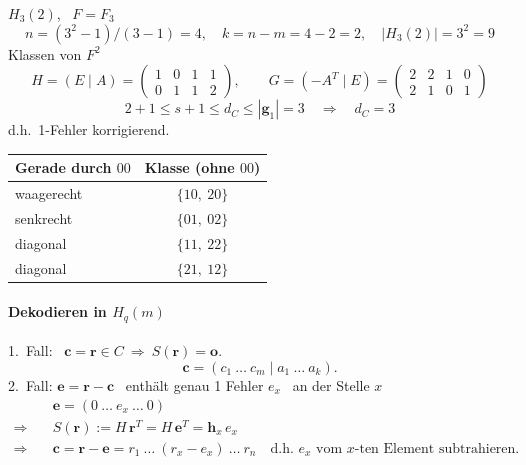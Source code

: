 \begin{beispiel}
$H_3(2)$, \ $F = F_3$
\[ n = (3^2 - 1)/(3 - 1) = 4, \quad k = n - m = 4 - 2 = 2, \quad |H_3(2)| = 3^2 = 9 \]
Klassen von $F^2$
\[
H = (E \mid A) = \begin{pmatrix} 1 & 0 & 1 & 1 \\ 0 & 1 & 1 & 2 \end{pmatrix}, \qquad
G = (-A^T \mid E) = \begin{pmatrix} 2 & 2 & 1 & 0 \\ 2 & 1 & 0 & 1 \end{pmatrix}
\]
\[ 2 + 1 \leq s + 1 \leq d_C \leq |\mathbf{g}_1| = 3 \quad \Rightarrow \quad d_C = 3 \]
d.h.\ 1-Fehler korrigierend.

\begin{center}
\begin{tabular}{lc}
\toprule
Gerade durch $00$ & Klasse (ohne $00$) \\
\midrule
waagerecht & $\{10,\ 20\}$ \\
senkrecht & $\{01,\ 02\}$ \\
diagonal & $\{11,\ 22\}$ \\
diagonal & $\{21,\ 12\}$ \\
\bottomrule
\end{tabular}
\end{center}
\end{beispiel}

\paragraph{Dekodieren in $H_q(m)$}
1.\ Fall: \ $\mathbf{c} = \mathbf{r} \in C \ \Rightarrow \ S(\mathbf{r}) = \mathbf{o}$.
\[ \mathbf{c} = (c_1\ \dots\ c_m \mid a_1\ \dots\ a_k). \]
2.\ Fall: $\mathbf{e} = \mathbf{r} - \mathbf{c}$ \ enthält genau 1 Fehler $e_x$ \ an der Stelle $x$
\begin{align*}
& \mathbf{e} = (0\ \dots\ e_x\ \dots\ 0) \\
\Rightarrow\quad & S(\mathbf{r}) := H\,\mathbf{r}^T = H\,\mathbf{e}^T = \mathbf{h}_x\,e_x \\
\Rightarrow\quad & \mathbf{c} = \mathbf{r} - \mathbf{e} = r_1\ \dots\ (r_x - e_x)\ \dots\ r_n \quad \text{d.h. } e_x \text{ vom } x\text{-ten Element subtrahieren.}
\end{align*}

